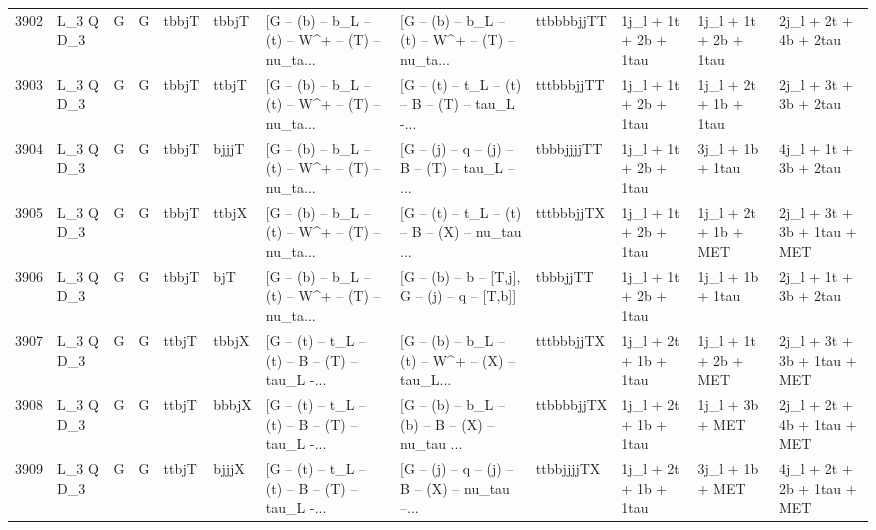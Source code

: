 \begin{tabular}{llllllllllll}
3902 &    L\_3 Q D\_3 &     G &     G &       tbbjT &       tbbjT &  [G -- (b) -- b\_L -- (t) -- W\textasciicircum + -- (T) -- nu\_ta... &  [G -- (b) -- b\_L -- (t) -- W\textasciicircum + -- (T) -- nu\_ta... &  ttbbbbjjTT &    1j\_l + 1t + 2b + 1tau &    1j\_l + 1t + 2b + 1tau &              2j\_l + 2t + 4b + 2tau \\
3903 &    L\_3 Q D\_3 &     G &     G &       tbbjT &       ttbjT &  [G -- (b) -- b\_L -- (t) -- W\textasciicircum + -- (T) -- nu\_ta... &  [G -- (t) -- t\_L -- (t) -- B -- (T) -- tau\_L -... &  tttbbbjjTT &    1j\_l + 1t + 2b + 1tau &    1j\_l + 2t + 1b + 1tau &              2j\_l + 3t + 3b + 2tau \\
3904 &    L\_3 Q D\_3 &     G &     G &       tbbjT &       bjjjT &  [G -- (b) -- b\_L -- (t) -- W\textasciicircum + -- (T) -- nu\_ta... &  [G -- (j) -- q -- (j) -- B -- (T) -- tau\_L -- ... &  tbbbjjjjTT &    1j\_l + 1t + 2b + 1tau &         3j\_l + 1b + 1tau &              4j\_l + 1t + 3b + 2tau \\
3905 &    L\_3 Q D\_3 &     G &     G &       tbbjT &       ttbjX &  [G -- (b) -- b\_L -- (t) -- W\textasciicircum + -- (T) -- nu\_ta... &  [G -- (t) -- t\_L -- (t) -- B -- (X) -- nu\_tau ... &  tttbbbjjTX &    1j\_l + 1t + 2b + 1tau &     1j\_l + 2t + 1b + MET &        2j\_l + 3t + 3b + 1tau + MET \\
3906 &    L\_3 Q D\_3 &     G &     G &       tbbjT &         bjT &  [G -- (b) -- b\_L -- (t) -- W\textasciicircum + -- (T) -- nu\_ta... &   [G -- (b) -- b -- [T,j], G -- (j) -- q -- [T,b]] &    tbbbjjTT &    1j\_l + 1t + 2b + 1tau &         1j\_l + 1b + 1tau &              2j\_l + 1t + 3b + 2tau \\
3907 &    L\_3 Q D\_3 &     G &     G &       ttbjT &       tbbjX &  [G -- (t) -- t\_L -- (t) -- B -- (T) -- tau\_L -... &  [G -- (b) -- b\_L -- (t) -- W\textasciicircum + -- (X) -- tau\_L... &  tttbbbjjTX &    1j\_l + 2t + 1b + 1tau &     1j\_l + 1t + 2b + MET &        2j\_l + 3t + 3b + 1tau + MET \\
3908 &    L\_3 Q D\_3 &     G &     G &       ttbjT &       bbbjX &  [G -- (t) -- t\_L -- (t) -- B -- (T) -- tau\_L -... &  [G -- (b) -- b\_L -- (b) -- B -- (X) -- nu\_tau ... &  ttbbbbjjTX &    1j\_l + 2t + 1b + 1tau &          1j\_l + 3b + MET &        2j\_l + 2t + 4b + 1tau + MET \\
3909 &    L\_3 Q D\_3 &     G &     G &       ttbjT &       bjjjX &  [G -- (t) -- t\_L -- (t) -- B -- (T) -- tau\_L -... &  [G -- (j) -- q -- (j) -- B -- (X) -- nu\_tau --... &  ttbbjjjjTX &    1j\_l + 2t + 1b + 1tau &          3j\_l + 1b + MET &        4j\_l + 2t + 2b + 1tau + MET \\

\end{tabular}
